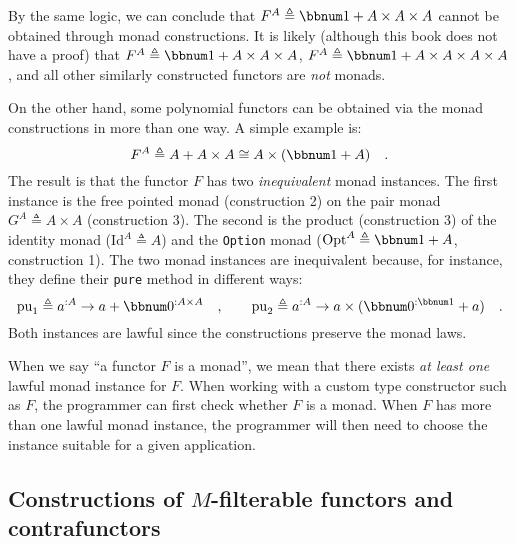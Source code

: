 By the same logic, we can conclude that $F^{A}\triangleq\bbnum 1+A\times A\times A$
cannot be obtained through monad constructions. It is likely (although
this book does not have a proof) that $F^{A}\triangleq\bbnum 1+A\times A\times A$,
$F^{A}\triangleq\bbnum 1+A\times A\times A\times A$, and all other
similarly constructed functors are \emph{not} monads.

On the other hand, some polynomial functors can be obtained via the
monad constructions in more than one way. A simple example is:
\[
F^{A}\triangleq A+A\times A\cong A\times(\bbnum 1+A)\quad.
\]
The result is that the functor $F$ has two \emph{inequivalent} monad
instances. The first instance is the free pointed monad (construction
2) on the pair monad $G^{A}\triangleq A\times A$ (construction 3).
The second is the product (construction 3) of the identity monad ($\text{Id}^{A}\triangleq A$)
and the \lstinline!Option! monad ($\text{Opt}^{A}\triangleq\bbnum 1+A$,
construction 1). The two monad instances are inequivalent because,
for instance, they define their \lstinline!pure! method in different
ways:
\[
\text{pu}_{1}\triangleq a^{:A}\rightarrow a+\bbnum 0^{:A\times A}\quad,\quad\quad\text{pu}_{2}\triangleq a^{:A}\rightarrow a\times(\bbnum 0^{:\bbnum 1}+a)\quad.
\]
Both instances are lawful since the constructions preserve the monad
laws.

When we say \textsf{``}a functor $F$ is a monad\textsf{''}, we mean that there exists\emph{
at least one} lawful monad instance for $F$. When working with a
custom type constructor such as $F$, the programmer can first check
whether $F$ is a monad. When $F$ has more than one lawful monad
instance, the programmer will then need to choose the instance suitable
for a given application.

\subsection{Constructions of $M$-filterable functors and contrafunctors\label{subsec:Constructions-of-M-filterables}}


